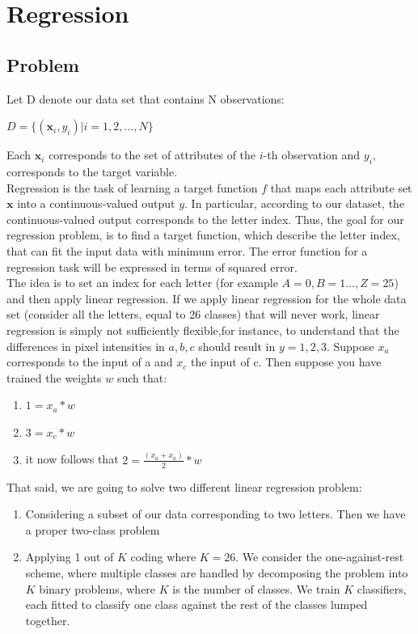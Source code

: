 \chapter*{Regression}
\setcounter{chapter}{1}
\section{Problem}
\setcounter{section}{1}
Let D denote our data set that contains N observations:
\begin{center}
$D = \{( \textbf{x}_i ,y_i ) | i = 1, 2, \dots, N\}$
\end{center}
Each $\textbf{x}_i $ corresponds to the set of attributes of the $i$-th observation and $y_i$, corresponds to the target variable. \\

Regression is the task of learning a target function $f$ that maps each attribute set $\textbf{x}$ into a continuous-valued output $y$. In particular, according to our dataset, the continuous-valued output corresponds to the letter index. 
Thus, the goal for our  regression problem, is to find a target function, which describe the letter index, that can fit the input data with minimum error. The error function for a regression task will be expressed in terms of squared error.\\

The idea is to set an index for each letter (for example $A=0, B=1 ... , Z = 25$) and then apply linear regression. 
If we apply linear regression for the whole data set (consider all the letters, equal to 26 classes) that will never work, linear regression is simply not sufficiently flexible,for instance, to understand that the differences in pixel intensities in $a, b, c$ should result in $y = 1, 2, 3$. Suppose $x_a$ corresponds to the input of a and $x_c$ the input of c. Then suppose you have trained the weights $w$ such that:
\begin{enumerate}
\item []$1 = x_a * w$
\item []$3 = x_c * w$
\item []it now follows that $2 = \frac{(x_a + x_a)}{2}* w$\\
\end{enumerate}

That said, we are going to solve two different linear regression problem:
\begin{enumerate}
\item Considering a subset of our data corresponding to two letters. Then we have a proper two-class problem
\item Applying 1 out of $K$ coding where $K=26$. We consider the one-against-rest scheme, where multiple classes are handled by decomposing the problem into $K$ binary problems, where $K$ is the number of classes. We train $K$ classifiers, each fitted to classify one class against the rest of the classes lumped together.
\end {enumerate}

